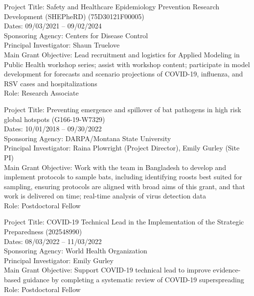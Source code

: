 \documentclass{cv}
\begin{document}
Project Title: Safety and Healthcare Epidemiology Prevention Research Development (SHEPheRD) (75D30121F00005) \\
Dates: 09/03/2021 -- 09/02/2024 \\
Sponsoring Agency: Centers for Disease Control \\
Principal Investigator: Shaun Truelove \\
Main Grant Objective: Lead recruitment and logistics for Applied Modeling in Public Health workshop series; assist with workshop content; participate in model development for forecasts and scenario projections of COVID-19, influenza, and RSV cases and hospitalizations \\
Role: Research Associate

Project Title: Preventing emergence and spillover of bat pathogens in high risk global hotspots (G166-19-W7329) \\
Dates: 10/01/2018 -- 09/30/2022 \\
Sponsoring Agency: DARPA/Montana State University \\
Principal Investigator: Raina Plowright (Project Director), Emily Gurley (Site PI) \\
Main Grant Objective: Work with the team in Bangladesh to develop and implement protocols to sample bats, including identifying roosts best suited for sampling, ensuring protocols are aligned with broad aims of this grant, and that work is delivered on time; real-time analysis of virus detection data \\
Role: Postdoctoral Fellow

Project Title: COVID-19 Technical Lead in the Implementation of the Strategic Preparedness (202548990) \\
Dates: 08/03/2022 -- 11/03/2022 \\
Sponsoring Agency: World Health Organization \\
Principal Investigator: Emily Gurley \\
Main Grant Objective: Support COVID-19 technical lead to improve evidence-based guidance by completing a systematic review of COVID-19 superspreading \\
Role: Postdoctoral Fellow


\end{document}
